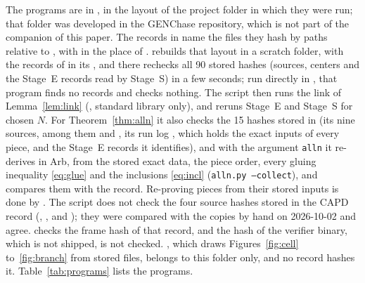 \documentclass[11pt]{article}
\theoremstyle{definition}
\begin{document}
The programs are in , in the layout of the project folder in which they were run; that folder was developed in the GENChase repository, which is not part of the companion of this paper. The records in  name the files they hash by paths relative to , with  in the place of .  rebuilds that layout in a scratch folder, with the records of  in its , and there  rechecks all 90 stored hashes (sources, centers and the Stage~E records read by Stage~S) in a few seconds; run directly in , that program finds no records and checks nothing. The script then runs the link of Lemma~\ref{lem:link} (, standard library only), and reruns Stage~E and Stage~S for chosen $N$. For Theorem~\ref{thm:alln} it also checks the 15 hashes stored in  (its nine sources, among them  and , its run log , which holds the exact inputs of every piece, and the Stage~E records it identifies), and with the argument \texttt{alln} it re-derives in Arb, from the stored exact data, the piece order, every gluing inequality \eqref{eq:glue} and the inclusions \eqref{eq:incl} (\texttt{alln.py --collect}), and compares them with the record. Re-proving pieces from their stored inputs is done by . The script does not check the four source hashes stored in the CAPD record  (, ,  and ); they were compared with the copies by hand on 2026-10-02 and agree.  checks the frame hash of that record, and the hash of the verifier binary, which is not shipped, is not checked. , which draws Figures~\ref{fig:cell} to~\ref{fig:branch} from stored files, belongs to this folder only, and no record hashes it. Table~\ref{tab:programs} lists the programs.
\end{document}

